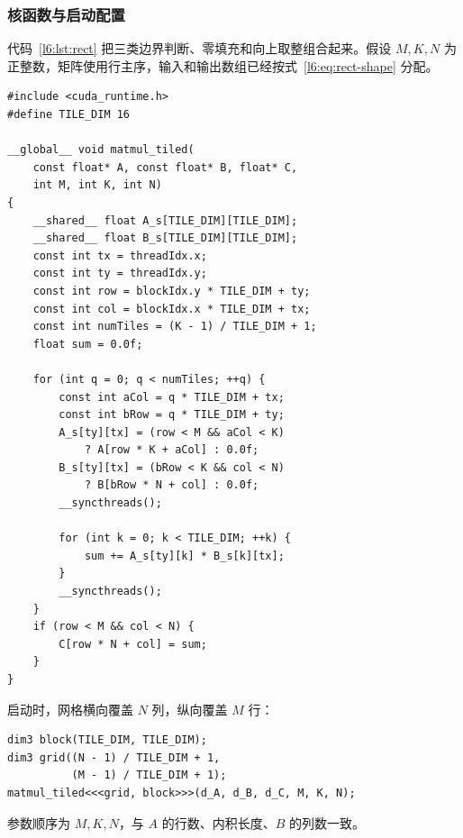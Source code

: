 \subsubsection{核函数与启动配置}
\par\noindent\begin{minipage}{\linewidth}
代码~\ref{l6:lst:rect} 把三类边界判断、零填充和向上取整组合起来。假设 $M,K,N$ 为正整数，矩阵使用行主序，输入和输出数组已经按式~\eqref{l6:eq:rect-shape} 分配。

\begin{lstlisting}[caption={一般尺寸的分块矩阵乘法；加载与同步由全部线程参与。},label={l6:lst:rect}]
#include <cuda_runtime.h>
#define TILE_DIM 16

__global__ void matmul_tiled(
    const float* A, const float* B, float* C,
    int M, int K, int N)
{
    __shared__ float A_s[TILE_DIM][TILE_DIM];
    __shared__ float B_s[TILE_DIM][TILE_DIM];
    const int tx = threadIdx.x;
    const int ty = threadIdx.y;
    const int row = blockIdx.y * TILE_DIM + ty;
    const int col = blockIdx.x * TILE_DIM + tx;
    const int numTiles = (K - 1) / TILE_DIM + 1;
    float sum = 0.0f;

    for (int q = 0; q < numTiles; ++q) {
        const int aCol = q * TILE_DIM + tx;
        const int bRow = q * TILE_DIM + ty;
        A_s[ty][tx] = (row < M && aCol < K)
            ? A[row * K + aCol] : 0.0f;
        B_s[ty][tx] = (bRow < K && col < N)
            ? B[bRow * N + col] : 0.0f;
        __syncthreads();

        for (int k = 0; k < TILE_DIM; ++k) {
            sum += A_s[ty][k] * B_s[k][tx];
        }
        __syncthreads();
    }
    if (row < M && col < N) {
        C[row * N + col] = sum;
    }
}
\end{lstlisting}
\end{minipage}\par

\par\noindent\begin{minipage}{\linewidth}
启动时，网格横向覆盖 $N$ 列，纵向覆盖 $M$ 行：

\begin{lstlisting}[numbers=none]
dim3 block(TILE_DIM, TILE_DIM);
dim3 grid((N - 1) / TILE_DIM + 1,
          (M - 1) / TILE_DIM + 1);
matmul_tiled<<<grid, block>>>(d_A, d_B, d_C, M, K, N);
\end{lstlisting}
\end{minipage}\par
参数顺序为 $M,K,N$，与 $A$ 的行数、内积长度、$B$ 的列数一致。


